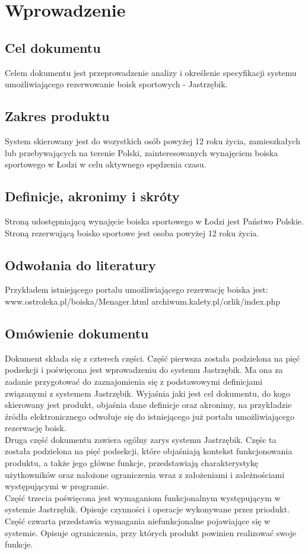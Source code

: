 \documentclass[a4paper, portrait,11pt]{article}
\begin{document}
\section {Wprowadzenie}

\subsection {Cel dokumentu}
Celem dokumentu jest przeprowadzenie analizy i określenie specyfikacji systemu umożliwiającego rezerwowanie boisk sportowych - Jastrzębik.

\subsection {Zakres produktu}
System skierowany jest do wszystkich osób powyżej 12 roku życia, zamieszkałych lub przebywających na terenie Polski, zainteresowanych wynajęciem boiska sportowego w Łodzi w celu aktywnego spędzenia czasu. 

\subsection {Definicje, akronimy i skróty}
Stroną udostępniającą wynajęcie boiska sportowego w Łodzi jest Państwo Polskie.
Stroną rezerwującą boisko sportowe jest osoba powyżej 12 roku życia. 

\subsection {Odwołania do literatury}
Przykładem istniejącego portalu umożliwiającego rezerwację boiska jest: www.ostroleka.pl/boiska/Menager.html
archiwum.kalety.pl/orlik/index.php

\subsection {Omówienie dokumentu}
Dokument składa się z czterech części. Część pierwsza  została podzielona na pięć podsekcji i poświęcona jest wprowadzeniu do systemu Jastrzębik. Ma ona za zadanie przygotować do zaznajomienia się z podstawowymi definicjami związanymi z systemem Jastrzębik. Wyjaśnia jaki jest cel dokumentu, do kogo skierowany jest produkt, objaśnia dane definicje oraz akronimy, na przykładzie źródła elektronicznego odwołuje się do istniejącego już portalu umożliwiającego rezerwację boisk. 
\\\indent
Druga część dokumentu zawiera ogólny zarys systemu Jastrzębik. Częśc ta została podzielona na pięć podsekcji, które objaśniają kontekst funkcjonowania produktu, a także jego główne funkcje, przedstawiają charakterystykę użytkowników oraz nałożone ograniczenia wraz z założeniami i zależnościami występującymi w programie.
\\\indent
Część trzecia poświęcona jest wymaganiom funkcjonalnym występującym w systemie Jastrzębik. Opisuje czynności i operacje wykonywane przez priodukt.
\\\indent
Część czwarta przedstawia wymagania niefunkcjonalne pojawiające się w systemie. Opisuje ograniczenia, przy których produkt powinien realizować swoje funkcje.
\end{document}
